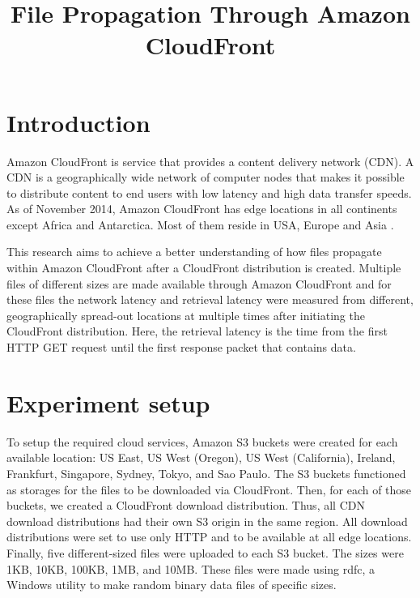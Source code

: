 \documentclass[conference]{IEEEtran}
\begin{document}
%
\title{File Propagation Through Amazon CloudFront}


\author{
\and
{}
}


\maketitle

\IEEEpeerreviewmaketitle



\section{Introduction}
Amazon CloudFront is service that provides a content delivery network (CDN). A CDN is a geographically wide network of computer nodes that makes it possible to distribute content to end users with low latency and high data transfer speeds. As of November 2014, Amazon CloudFront has edge locations in all continents except Africa and Antarctica. Most of them reside in USA, Europe and Asia \cite{CloudFront_product_details}.

This research aims to achieve a better understanding of how files propagate within Amazon CloudFront after a CloudFront distribution is created.  Multiple files of different sizes are made available through Amazon CloudFront and for these files the network latency and retrieval latency were measured from different, geographically spread-out locations at multiple times after initiating the CloudFront distribution. Here, the retrieval latency is the time from the first HTTP GET request until the first response packet that contains data.

\section{Experiment setup}
To setup the required cloud services, Amazon S3 buckets were created for each available location: US East, US West (Oregon), US West (California), Ireland, Frankfurt, Singapore, Sydney, Tokyo, and Sao Paulo. The S3 buckets functioned as storages for the files to be downloaded via CloudFront. Then, for each of those buckets, we created a CloudFront download distribution. Thus, all CDN download distributions had their own S3 origin in the same region. All download distributions were set to use only HTTP and to be available at all edge locations. Finally, five different-sized files were uploaded to each S3 bucket. The sizes were 1KB, 10KB, 100KB, 1MB, and 10MB. These files were made using rdfc, a Windows utility to make random binary data files of specific sizes.
\end{document}
